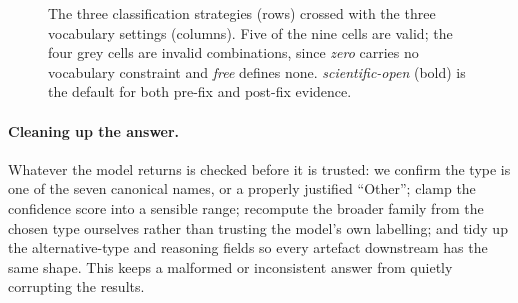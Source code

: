 \begin{figure}[H]
\centering
{}
\caption{The three classification strategies (rows) crossed with the three
         vocabulary settings (columns). Five of the nine cells are valid; the
         four grey cells are invalid combinations, since \textit{zero} carries
         no vocabulary constraint and \textit{free} defines none.
         \textit{scientific-open} (bold) is the default for both pre-fix and
         post-fix evidence.}
\label{fig:conditions}
\end{figure}

\paragraph{Cleaning up the answer.}
Whatever the model returns is checked before it is trusted: we confirm the type
is one of the seven canonical names, or a properly justified ``Other''; clamp the
confidence score into a sensible range; recompute the broader family from the
chosen type ourselves rather than trusting the model's own labelling; and tidy up
the alternative-type and reasoning fields so every artefact downstream has the
same shape. This keeps a malformed or inconsistent answer from quietly
corrupting the results.

